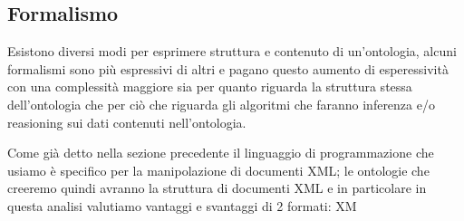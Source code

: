 	\subsection{Formalismo}
		Esistono diversi modi per esprimere struttura e contenuto di un'ontologia, alcuni formalismi sono più espressivi di altri e pagano questo aumento di esperessività con una complessità maggiore sia per quanto riguarda la struttura stessa dell'ontologia che per ciò che riguarda gli algoritmi che faranno inferenza e/o reasioning sui dati contenuti nell'ontologia.
		
		Come già detto nella sezione precedente il linguaggio di programmazione che usiamo è specifico per la manipolazione di documenti XML; le ontologie che creeremo quindi avranno la struttura di documenti XML e in particolare in questa analisi valutiamo vantaggi e svantaggi di 2 formati: XM